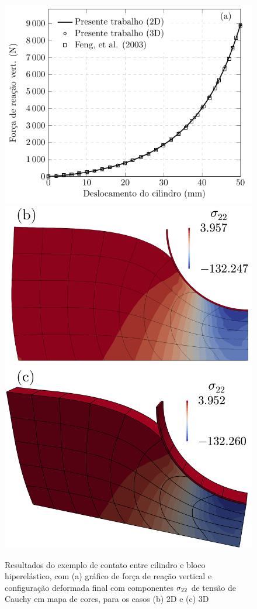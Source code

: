 \documentclass[Tese.tex]{subfiles}
\begin{document}
\begin{figure}[!htb]
	\centering
	\caption{Resultados do exemplo de contato entre cilindro e bloco hiperelástico, com (a) gráfico de força de reação vertical e configuração deformada final com componentes ${\sigma}_{22}$ de tensão de Cauchy em mapa de cores, para os casos (b) 2D e (c) 3D}
	\label{fig:exemploContatoResults}
	\includegraphics[scale=1.0]{Figuras/ExemplosContato/ExemploContatoReaction.pdf}\;\;\includegraphics[scale=0.14]{Figuras/ExemplosContato/ExemploContatoResults2D3D.png}	
\end{figure}
\end{document}
